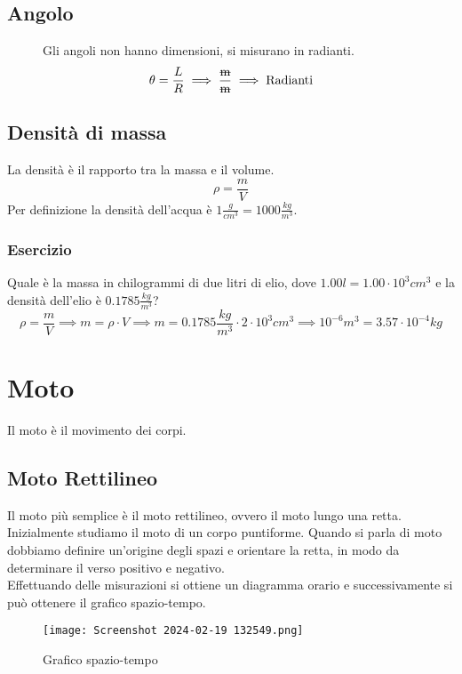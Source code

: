 \documentclass[../../main.tex]{subfiles}
\begin{document}
\subsection{Angolo}
\begin{figure}[h!]
    \begin{minipage}{0.45\linewidth}
    \end{minipage}
    \hfill
    \begin{minipage}{0.5\linewidth}
        Gli angoli non hanno dimensioni, si misurano in radianti.
        \[
            \theta = \frac{L}{R} \implies \dfrac{\text{\sout{m}}}{\text{\sout{m}}} \implies \text{Radianti}
        \]
    \end{minipage}
\end{figure}
\subsection{Densità di massa}
La densità è il rapporto tra la massa e il volume.
\[
    \rho = \frac{m}{V}
\]
Per definizione la densità dell'acqua è $1 \frac{g}{cm^3} = 1000 \frac{kg}{m^3}$.\\
\subsubsection{Esercizio}
Quale è la massa in chilogrammi di due litri di elio, dove $1.00l = 1.00 \cdot 10^3 cm^3$ e la densità dell'elio è $0.1785 \frac{kg}{m^3}$?\\
\[
    \rho = \frac{m}{V} \implies m = \rho \cdot V \implies m = 0.1785 \frac{kg}{m^3} \cdot 2 \cdot 10^{3} cm^3 \implies 10^{-6} m^3 = 3.57 \cdot 10^{-4} kg
\]

\newpage
\section{Moto}
Il moto è il movimento dei corpi.
\subsection{Moto Rettilineo}
Il moto più semplice è il moto rettilineo, ovvero il moto lungo una retta. Inizialmente studiamo il moto di un corpo puntiforme.
Quando si parla di moto dobbiamo definire un'origine degli spazi e orientare la retta, in modo da determinare il verso positivo e
negativo.\\
Effettuando delle misurazioni si ottiene un diagramma orario e successivamente si può ottenere il grafico spazio-tempo.\\
\begin{figure}[h!]
    \centering
    \texttt{[image: Screenshot 2024-02-19 132549.png]}
    \caption{Grafico spazio-tempo}
\end{figure}
\end{document}
